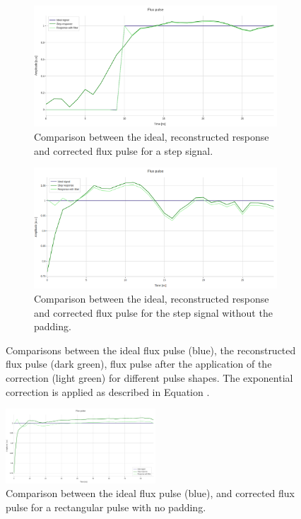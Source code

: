 \begin{figure}[h!]
    \centering
    \begin{subfigure}[t]{0.495\textwidth}
        \includegraphics[width=\textwidth]{figures/png/Cryoscope/filters/step_inverse.png}
        \caption{Comparison between the ideal, reconstructed response and corrected flux pulse for a step signal.}
        \label{fig:inverse:step}
    \end{subfigure}
    \hfill
    \begin{subfigure}[t]{0.495\textwidth}
        \includegraphics[width=\textwidth]{figures/png/Cryoscope/filters/inverse_no_pad.png}
        \caption{Comparison between the ideal, reconstructed response and corrected flux pulse for the step signal without the padding.}
        \label{fig:inverse:no_pad}
    \end{subfigure}
    \caption{Comparisons between the ideal flux pulse (blue), the reconstructed flux pulse (dark green), flux pulse after the application of the correction (light green) for different pulse shapes.
    The exponential correction is applied as described in Equation \label{eq:inverse}.}
    \label{fig:inverse_short}
\end{figure}

\begin{figure}[h!]
    \centering
    \includegraphics[width=0.5\textwidth]{figures/png/Cryoscope/filters_long/inverse.png}
    \caption{Comparison between the ideal flux pulse (blue), and corrected flux pulse for a rectangular pulse with no padding.}
    \label{fig:inverse:long}
\end{figure}

